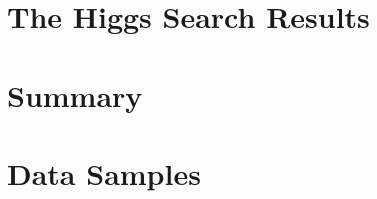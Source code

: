 \documentclass{cmspaper}
\begin{document}
\newpage 


\section{The Higgs Search Results}
   \label{sec:dataresults}
   

\section{Summary}
     \label{sec:summary}



\clearpage 
\appendix
\appendixpage

\section{Data Samples}
  \label{sec:appendix_datasets}
  


\end{document}
